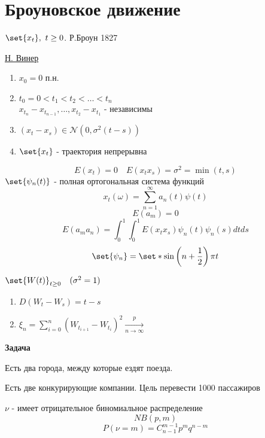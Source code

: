 \documentclass[a4paper]{article}
\DeclarePairedDelimiter\set\{\}
\theoremstyle{definition}
\theoremstyle{remark}
\begin{document}
\section*{\centering Броуновское движение}

$ \set{x_t}, \ t \geq 0 $. Р.Броун 1827

\underline{Н. Винер}

\begin{enumerate}
    \item $ x_0 = 0 $ п.н.
    \item $ t_0 = 0 < t_1 < t_2 < \dots < t_n $\\
        $ x_{t_n} - x_{t_{n-1}}, \dots, x_{t_2} - x_{t_1} $ - независимы 
    \item $ (x_t - x_s) \in \mathcal{N}(0, \sigma^2(t-s)) $ 
    \item $ \set{x_t} $ - траектория непрерывна
\end{enumerate}

\[
    E(x_t) = 0 \quad E(x_tx_s) = \sigma^2 = \min(t,s)
\]
$ \set{\psi_n(t)} $ - полная ортогональная система функций
\[
    x_t(\omega) = \sum_{n=1}^{\infty} a_n(t) \psi(t)
\]
\[
    E(a_m) = 0
\]
\[
    E(a_ma_n) = \int_{0}^{1} \int_{0}^{1} E(x_tx_s) \psi_n(t) \psi_n(s) dt ds
\]
\[
    \set{\psi_n} = \set*{\sin\left(n + \frac{1}{2}\right) \pi t}
\]

$ \set{W(t)}_{t \geq 0} \quad (\sigma^2 = 1) $ 
\begin{enumerate}
    \item $ D(W_t - W_s) = t-s $ 
    \item $ \xi_n = \sum_{i=0}^{n} (W_{t_{i+1}} - W_{t_i})^2 
        \xrightarrow[n\to \infty]{p} $ 
\end{enumerate}

\textbf{Задача}

Есть два города, между которые ездят поезда.

Есть две конкурирующие компании. Цель перевести 1000 пассажиров

$ \nu $ - имеет отрицательное биномиальное распределение
\[
    NB(p, m)
\]
\[
    P(\nu = m) = C_{n-1}^{m-1} p^m q ^{n-m}
\]
\end{document}
